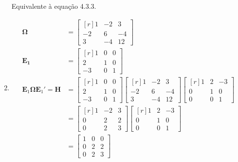 \begin{enumerate}
		Equivalente à equação 4.3.3.
		
	 
	
	\item[\fbox{4.3}]
	
\begin{align*}
	\boldsymbol{\Omega}&=\begin{bmatrix*}[r]
		1&-2&3\\
		-2&6&-4\\
		3&-4&12
	\end{bmatrix*}\\
	\mathbf{E_1}&=\begin{bmatrix*}[r]
	1&0&0\\
	2&1&0\\
	-3&0&1
	\end{bmatrix*}\\
	\mathbf{E}_1\boldsymbol{\Omega}\mathbf{E}_1{'}=\mathbf{H}&=\begin{bmatrix*}[r]
	1&0&0\\
	2&1&0\\
	-3&0&1
	\end{bmatrix*}\begin{bmatrix*}[r]
	1&-2&3\\
	-2&6&-4\\
	3&-4&12
	\end{bmatrix*}\begin{bmatrix*}[r]
	1&2&-3\\
	0&1&0\\
	0&0&1
	\end{bmatrix*}\\
	&=\begin{bmatrix*}[r]
	1&-2&3\\
	0&2&2\\
	0&2&3
	\end{bmatrix*}
	\begin{bmatrix*}[r]
	1&2&-3\\
	0&1&0\\
	0&0&1
	\end{bmatrix*}\\
	&=\begin{bmatrix}
		1&0&0\\
		0&2&2\\
		0&2&3
	\end{bmatrix}
\end{align*}	


\end{enumerate}
